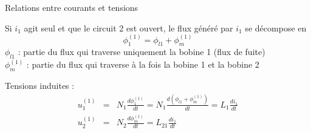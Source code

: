 
\begin{frame}{Relations entre courants et tensions}
	
	Si $i_1$ agit seul et que le circuit 2 est ouvert, 
	le flux généré par $i_1$ se décompose en 
	\[\phi_1^{(1)}=\phi_{l1}+\phi_m^{(1)}\]
	$\phi_{l1}$ : partie du flux qui traverse uniquement la bobine 1 (flux de fuite)\\
	$\phi_m^{(1)}$ : partie du flux qui traverse à la fois la bobine 1 et la bobine 2
	
	\vfill
	Tensions induites :
	\begin{eqnarray*}
		u_1^{(1)} & = &N_1\frac{d\phi_1^{(1)}}{dt}=N_1\frac{d(\phi_{l1}+\phi_m^{(1)})}{dt}=L_1\frac{di_1}{dt}\\
		u_2^{(1)} & = & N_2\frac{d\phi_m^{(1)}}{dt}=L_{21}\frac{di_1}{dt}
	\end{eqnarray*}
	
\end{frame}


